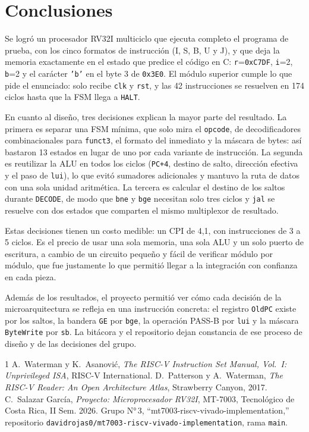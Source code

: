 \documentclass[conference]{IEEEtran}
\newcommand{\cod}[1]{\texttt{\small #1}}
\begin{document}
\section{Conclusiones}
Se logró un procesador RV32I multiciclo que ejecuta completo el programa de prueba, con los cinco formatos de instrucción (I, S, B, U y J), y que deja la memoria exactamente en el estado que predice el código en C: \cod{r}=\cod{0xC7DF}, \cod{i}=2, \cod{b}=2 y el carácter \texttt{'b'} en el byte 3 de \cod{0x3E0}. El módulo superior cumple lo que pide el enunciado: solo recibe \cod{clk} y \cod{rst}, y las 42 instrucciones se resuelven en 174 ciclos hasta que la FSM llega a \cod{HALT}.

En cuanto al diseño, tres decisiones explican la mayor parte del resultado. La primera es separar una FSM mínima, que solo mira el \cod{opcode}, de decodificadores combinacionales para \cod{funct3}, el formato del inmediato y la máscara de bytes: así bastaron 13 estados en lugar de uno por cada variante de instrucción. La segunda es reutilizar la ALU en todos los ciclos (\cod{PC+4}, destino de salto, dirección efectiva y el paso de \cod{lui}), lo que evitó sumadores adicionales y mantuvo la ruta de datos con una sola unidad aritmética. La tercera es calcular el destino de los saltos durante \cod{DECODE}, de modo que \cod{bne} y \cod{bge} necesitan solo tres ciclos y \cod{jal} se resuelve con dos estados que comparten el mismo multiplexor de resultado.

Estas decisiones tienen un costo medible: un CPI de 4,1, con instrucciones de 3 a 5 ciclos. Es el precio de usar una sola memoria, una sola ALU y un solo puerto de escritura, a cambio de un circuito pequeño y fácil de verificar módulo por módulo, que fue justamente lo que permitió llegar a la integración con confianza en cada pieza.

Además de los resultados, el proyecto permitió ver cómo cada decisión de la microarquitectura se refleja en una instrucción concreta: el registro \cod{OldPC} existe por los saltos, la bandera \cod{GE} por \cod{bge}, la operación PASS-B por \cod{lui} y la máscara \cod{ByteWrite} por \cod{sb}. La bitácora y el repositorio dejan constancia de ese proceso de diseño y de las decisiones del grupo.

\begin{thebibliography}{1}
 A.~Waterman y K.~Asanović, \emph{The RISC-V Instruction Set Manual, Vol.~I: Unprivileged ISA}, RISC-V International.
 D.~Patterson y A.~Waterman, \emph{The RISC-V Reader: An Open Architecture Atlas}, Strawberry Canyon, 2017.
 C.~Salazar García, \emph{Proyecto: Microprocesador RV32I}, MT-7003, Tecnológico de Costa Rica, II Sem. 2026.
 Grupo N°\,3, ``mt7003-riscv-vivado-implementation,'' repositorio \texttt{davidrojas0/mt7003-riscv-vivado-implementation}, rama \texttt{main}.
\end{thebibliography}
\end{document}
